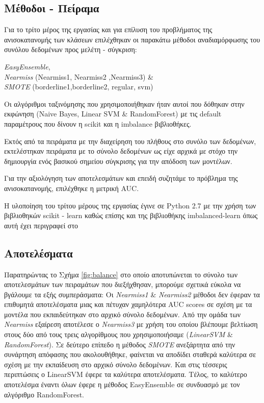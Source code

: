 \subsection{Μέθοδοι - Πείραμα}

Για το τρίτο μέρος της εργασίας και για επίλυση του προβλήματος της ανισοκατανομής των κλάσεων επιλέχθηκαν οι παρακάτω μέθοδοι αναδιαμόρφωσης του συνόλου δεδομένων προς μελέτη - σύγκριση: 

\emph{EasyEnsemble},\\ \emph{Nearmiss} (Nearmiss1, Nearmiss2 ,Nearmiss3)  \& \\ \emph{SMOTE} (borderline1,borderline2, regular, svm)

Οι αλγόριθμοι ταξινόμησης που χρησιμοποιήθηκαν ήταν αυτοί που δόθηκαν στην εκφώνηση (Naive Bayes, Linear SVM \& RandomForest) με τις default παραμέτρους που δίνουν η scikit και η imbalance βιβλιοθήκες.

Εκτός από τα πειράματα με την διαχείρηση του πλήθους στο συνόλο των δεδομένων, εκτελέστηκαν πειράματα με το σύνολο δεδομένων ως είχε αρχικά με στόχο την δημιουργία ενός βασικού σημείου σύγκρισης για την απόδοση των μοντέλων. 

Για την αξιολόγηση των αποτελεσμάτων και επειδή συζητάμε το πρόβλημα της ανισοκατανομής, επιλέχθηκε η μετρική AUC.

Η υλοποίηση του τρίτου μέρους της εργασίας έγινε σε Python 2.7 με την χρήση των βιβλιοθηκών scikit - learn \citep{scikit-learn} καθώς επίσης και της βιβλιοθήκης imbalanced-learn όπως αυτή έχει περιγραφεί στο \citep{JMLR:v18:16-365}

\subsection{Αποτελέσματα}

Παρατηρώντας το Σχήμα \ref{fig:balance} στο οποίο αποτυπώνεται το σύνολο των αποτελεσμάτων των πειραμάτων που διεξήχθησαν, μπορούμε σχετικά εύκολα να βγάλουμε τα εξής συμπεράσματα: Οι \emph{Nearmiss1} \& \emph{Nearmiss2} μέθοδοι δεν έφεραν τα επιθυμητά αποτελέσματα μιας και πέτυχαν χαμηλότερα AUC scores σε σχέση με τα μοντέλα που εκπαιδεύτηκαν στο αρχικό σύνολο δεδομένων. Από την ομάδα των \emph{Nearmiss} εξαίρεση αποτέλεσε ο \emph{Nearmiss3} με χρήση του οποίου βλέπουμε βελτίωση στους δύο από τους τρεις αλγορίθμους που χρησιμοποιήσαμε (\emph{LinearSVM} \& \emph{RandomForest}). Σε δεύτερο επίπεδο η μέθοδος \emph{SMOTE} ανεξάρτητα από την συνάρτηση απόφασης που ακολουθήθηκε, φαίνεται να αποδίδει σταθερά καλύτερα σε σχέση με την εκπαίδευση στο αρχικό σύνολο δεδομένων. Και στις τέσσερις περιπτώσεις ο LinearSVM έφερε τα καλύτερα αποτελέσματα. Τέλος, το καλύτερο αποτελέσμα έναντι όλων έφερε η μέθοδος EasyEnsemble σε συνδυασμό με τον αλγόριθμο RandomForest.

